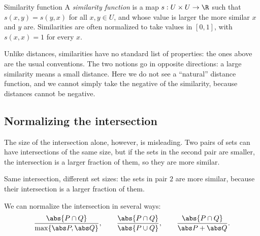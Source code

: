 \documentclass[a4paper,12pt,oneside]{report}
\begin{document}
\begin{frameddefn}{Similarity function}\label{def:similarity}
A \emph{similarity function} is a map $s:U\times U\to\R$ such that
$s(x,y)=s(y,x)$ for all $x,y\in U$, and whose value is larger the more
similar $x$ and $y$ are. Similarities are often normalized to take
values in $[0,1]$, with $s(x,x)=1$ for every $x$.
\end{frameddefn}

Unlike distances, similarities have no standard list of properties:
the ones above are the usual conventions. The two notions go in
opposite directions: a large similarity means a small distance. Here
we do not see a ``natural'' distance function, and we cannot simply
take the negative of the similarity, because distances cannot be
negative.

\subsection{Normalizing the intersection}

The size of the intersection alone, however, is misleading. Two pairs
of sets can have intersections of the same size, but if the sets in the
second pair are smaller, the intersection is a larger fraction of them,
so they are more similar.

\begin{center}

{\small Same intersection, different set sizes: the sets in pair $2$
are more similar, because their intersection is a larger fraction of
them.}
\end{center}

We can normalize the intersection in several ways:
\[
  \frac{\abs{P\cap Q}}{\max\{\abs P,\abs Q\}},\qquad
  \frac{\abs{P\cap Q}}{\abs{P\cup Q}},\qquad
  \frac{\abs{P\cap Q}}{\abs P+\abs Q}.
\]
\end{document}
